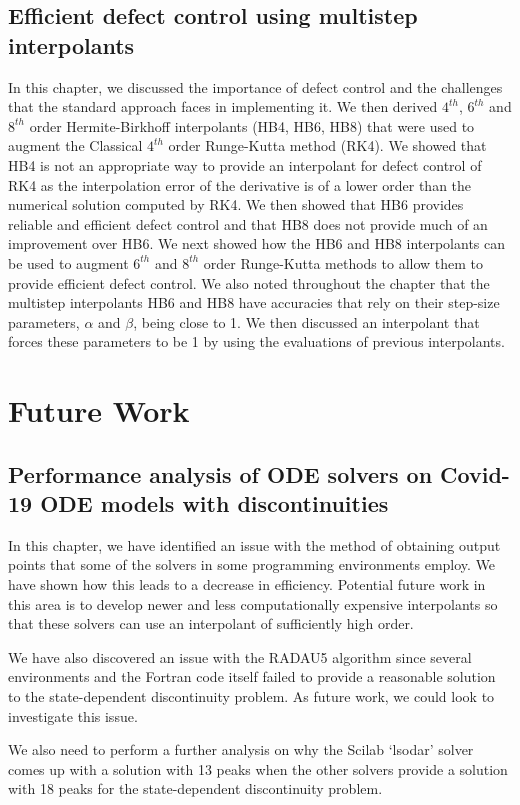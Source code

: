 \documentclass{report}
\begin{document}
\subsection{Efficient defect control using multistep interpolants}
In this chapter, we discussed the importance of defect control and the challenges that the standard approach faces in implementing it. We then derived $4^{th}$, $6^{th}$ and $8^{th}$ order Hermite-Birkhoff interpolants (HB4, HB6, HB8) that were used to augment the Classical $4^{th}$ order Runge-Kutta method (RK4). We showed that HB4 is not an appropriate way to provide an interpolant for defect control of RK4 as the interpolation error of the derivative is of a lower order than the numerical solution computed by RK4. We then showed that HB6 provides reliable and efficient defect control and that HB8 does not provide much of an improvement over HB6. We next showed how the HB6 and HB8 interpolants can be used to augment $6^{th}$ and $8^{th}$ order Runge-Kutta methods to allow them to provide efficient defect control. We also noted throughout the chapter that the multistep interpolants HB6 and HB8 have accuracies that rely on their step-size parameters, $\alpha$ and $\beta$, being close to 1. We then discussed an interpolant that forces these parameters to be 1 by using the evaluations of previous interpolants.

\section{Future Work}
\subsection{Performance analysis of ODE solvers on Covid-19 ODE models with discontinuities}
In this chapter, we have identified an issue with the method of obtaining output points that some of the solvers in some programming environments employ. We have shown how this leads to a decrease in efficiency. Potential future work in this area is to develop newer and less computationally expensive interpolants so that these solvers can use an interpolant of sufficiently high order.

We have also discovered an issue with the RADAU5 algorithm since several environments and the Fortran code itself failed to provide a reasonable solution to the state-dependent discontinuity problem. As future work, we could look to investigate this issue. 

We also need to perform a further analysis on why the Scilab `lsodar' solver comes up with a solution with 13 peaks when the other solvers provide a solution with 18 peaks for the state-dependent discontinuity problem.
\end{document}
